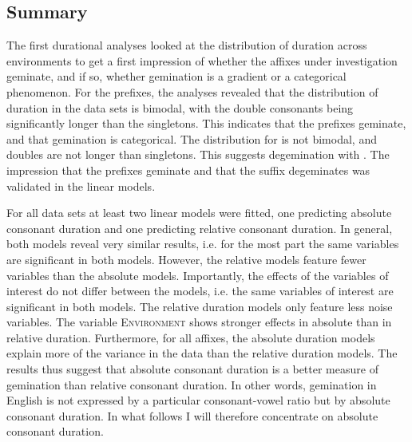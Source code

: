 \subsection{Summary} \label{Summary Corpus Study}

The first durational analyses looked at the distribution of duration across environments to get a first impression of whether the affixes under investigation geminate, and if so, whether gemination is a gradient or a categorical phenomenon. 
For the prefixes, the analyses revealed that the distribution of duration in the data sets is bimodal, with the double consonants being significantly longer than the singletons. This indicates that the prefixes geminate, and that gemination is categorical. The distribution for  is not bimodal, and doubles are not longer than singletons. This suggests degemination with . The impression that the prefixes geminate and that the suffix degeminates was validated in the linear models.

\clearpage
For all data sets at least two linear models were fitted, one predicting absolute consonant duration and one predicting relative consonant duration. 
In general, both models reveal very similar results, i.e. for the most part the same variables are significant in both models. However, the relative models feature fewer variables than the absolute models.  Importantly, the effects of the variables of interest do not differ between the models, i.e. the same variables of interest are significant in both models. The relative duration models only feature less noise variables. 
The variable \textsc{Environment} shows stronger effects in absolute than in relative duration. 
Furthermore, for all affixes, the absolute duration models explain more of the variance in the data than the relative duration models. 
The results thus suggest that absolute consonant duration is a better measure of gemination than relative consonant duration. In other words, gemination in English is not expressed by a particular consonant-vowel ratio but by absolute consonant duration. 
In what follows I will therefore concentrate on absolute consonant duration.

